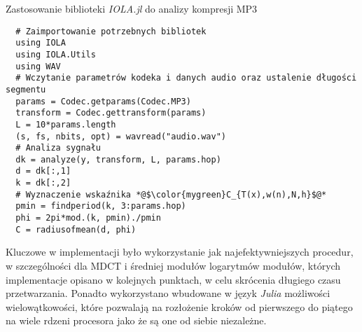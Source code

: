 \documentclass[pl,12pt]{aghdpl}
\begin{document}
\begin{program}
  \caption{Zastosowanie biblioteki \textit{IOLA.jl} do analizy kompresji MP3}
  \label{lst:IOLA_example}
  \begin{lstlisting}
  # Zaimportowanie potrzebnych bibliotek
  using IOLA
  using IOLA.Utils
  using WAV
  # Wczytanie parametrów kodeka i danych audio oraz ustalenie długości segmentu
  params = Codec.getparams(Codec.MP3)
  transform = Codec.gettransform(params)
  L = 10*params.length
  (s, fs, nbits, opt) = wavread("audio.wav")
  # Analiza sygnału
  dk = analyze(y, transform, L, params.hop)
  d = dk[:,1]
  k = dk[:,2]
  # Wyznaczenie wskaźnika *@$\color{mygreen}C_{T(x),w(n),N,h}$@*
  pmin = findperiod(k, 3:params.hop)
  phi = 2pi*mod.(k, pmin)./pmin
  C = radiusofmean(d, phi)
  \end{lstlisting}
\end{program}

Kluczowe w implementacji było wykorzystanie jak najefektywniejszych procedur, w
szczególności dla MDCT i średniej modułów logarytmów modułów, których
implementacje opisano w kolejnych punktach, w celu skrócenia
długiego czasu przetwarzania. Ponadto wykorzystano wbudowane w język
\textit{Julia} możliwości wielowątkowości, które pozwalają na rozłożenie kroków
od pierwszego do piątego na wiele rdzeni procesora jako że są one od siebie
niezależne.
\end{document}
